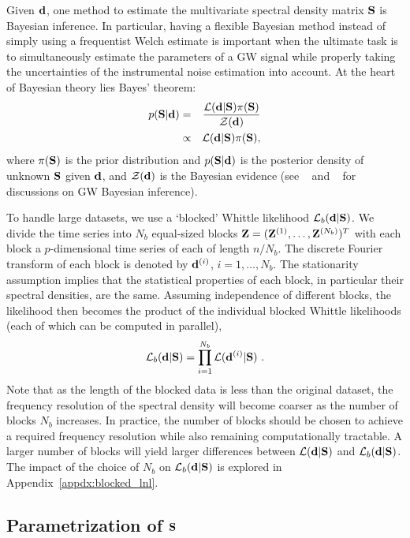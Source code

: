 \documentclass[%
 reprint,
 amsmath,amssymb,
 aps,
 nofootinbib,
]{revtex4-2}
\begin{document}
Given $\d$, one method to estimate the multivariate spectral density matrix $\S$ is Bayesian inference. In particular, having a flexible Bayesian method instead of simply using a frequentist Welch estimate is important when the ultimate task is to simultaneously estimate the parameters of a GW signal while properly taking the uncertainties of the instrumental noise estimation into account. At the heart of Bayesian theory lies Bayes' theorem: 
\begin{eqnarray}
    p(\S|\d) &=& \frac{\mathcal{L}(\d|\S)\pi(\S)}{\mathcal{Z}(\d)} \\
    &\propto& \mathcal{L}(\d|\S)\pi(\S) ,
\end{eqnarray}
where $\pi(\S)$ is the prior distribution and $p(\S|\d)$ is the posterior density of unknown $\S$ given $\d$, 
and $\mathcal{Z}(\d)$ is the Bayesian evidence (see ~\citet{thrane_talbot_bayesian_primer} and ~\citet{Christensen_PE_for_GW} for discussions on \ac{GW} Bayesian inference).


To handle large datasets, we use a `blocked' Whittle likelihood $\mathcal{L}_b(\d|\S)$. We divide the time series into $N_{b}$ equal-sized blocks $\Z=(\Z^{(1)},\ldots,\Z^{(N_{b})})^T$ with each block a $p$-dimensional time series of each of length $n/N_{b}$. The discrete Fourier transform of each block is denoted by 
$\d^{(i)}$, $i=1,\ldots,N_{b}$. The stationarity assumption implies that the statistical properties of each block, in particular their spectral densities, are the same.
Assuming independence of different blocks, 
the likelihood then becomes the product of the individual blocked Whittle likelihoods (each of which can be computed in parallel), 
\begin{equation}\label{eq:block_lnl}
    \mathcal{L}_b(\d|\S) = \prod^{N_b}_{i=1} \mathcal{L}(\d^{(i)}|\S) \ .
\end{equation}
Note that as the length of the blocked data is less than the original dataset, the frequency resolution of the spectral density will become coarser as the number of blocks $N_b$ increases. 
In practice, the number of blocks should be chosen to achieve a required frequency resolution while also remaining computationally tractable. 
A larger number of blocks will yield larger 
 differences between $\mathcal{L}(\d|\S)$ and $\mathcal{L}_b(\d|\S)$. 
The impact of the choice of $N_b$ on $\mathcal{L}_b(\d|\S)$ is explored in Appendix~\ref{appdx:blocked_lnl}. 

\subsection{Parametrization of $\S$}
\end{document}
